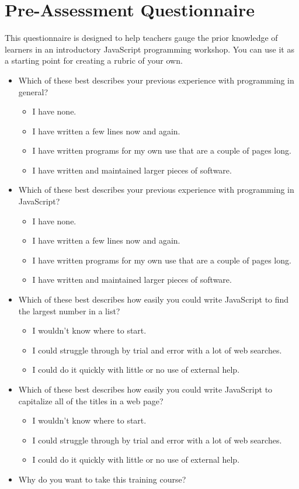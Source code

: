\chapter{Pre-Assessment Questionnaire}\label{s:preassess}

This questionnaire is designed to help teachers gauge the prior
knowledge of learners in an introductory JavaScript programming
workshop. You can use it as a starting point for creating a rubric of
your own.

\begin{itemize}
\item
  Which of these best describes your previous experience with
  programming in general?

  \begin{itemize}
  \item
    I have none.
  \item
    I have written a few lines now and again.
  \item
    I have written programs for my own use that are a couple of
    pages long.
  \item
    I have written and maintained larger pieces of software.
  \end{itemize}
\item
  Which of these best describes your previous experience with
  programming in JavaScript?

  \begin{itemize}
  \item
    I have none.
  \item
    I have written a few lines now and again.
  \item
    I have written programs for my own use that are a couple of
    pages long.
  \item
    I have written and maintained larger pieces of software.
  \end{itemize}
\item
  Which of these best describes how easily you could write JavaScript
  to find the largest number in a list?

  \begin{itemize}
  \item
    I wouldn't know where to start.
  \item
    I could struggle through by trial and error with a lot of web
    searches.
  \item
    I could do it quickly with little or no use of external help.
  \end{itemize}
\item
  Which of these best describes how easily you could write JavaScript
  to capitalize all of the titles in a web page?

  \begin{itemize}
  \item
    I wouldn't know where to start.
  \item
    I could struggle through by trial and error with a lot of web
    searches.
  \item
    I could do it quickly with little or no use of external help.
  \end{itemize}
\item
  Why do you want to take this training course?
\end{itemize}
